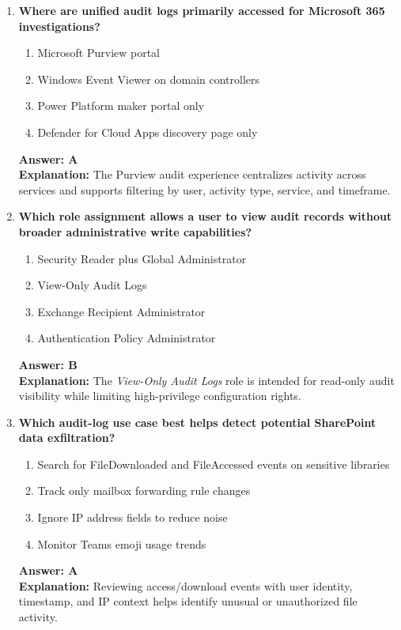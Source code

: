 \documentclass[10pt]{article}
\begin{document}
\begin{enumerate}[leftmargin=*]
\item \textbf{Where are unified audit logs primarily accessed for Microsoft 365 investigations?}
\begin{enumerate}[label=\Alph*.]
  \item Microsoft Purview portal
  \item Windows Event Viewer on domain controllers
  \item Power Platform maker portal only
  \item Defender for Cloud Apps discovery page only
\end{enumerate}
\textbf{Answer: A}\\
\textbf{Explanation:} The Purview audit experience centralizes activity across services and supports filtering by user, activity type, service, and timeframe.

\item \textbf{Which role assignment allows a user to view audit records without broader administrative write capabilities?}
\begin{enumerate}[label=\Alph*.]
  \item Security Reader plus Global Administrator
  \item View-Only Audit Logs
  \item Exchange Recipient Administrator
  \item Authentication Policy Administrator
\end{enumerate}
\textbf{Answer: B}\\
\textbf{Explanation:} The \textit{View-Only Audit Logs} role is intended for read-only audit visibility while limiting high-privilege configuration rights.

\item \textbf{Which audit-log use case best helps detect potential SharePoint data exfiltration?}
\begin{enumerate}[label=\Alph*.]
  \item Search for FileDownloaded and FileAccessed events on sensitive libraries
  \item Track only mailbox forwarding rule changes
  \item Ignore IP address fields to reduce noise
  \item Monitor Teams emoji usage trends
\end{enumerate}
\textbf{Answer: A}\\
\textbf{Explanation:} Reviewing access/download events with user identity, timestamp, and IP context helps identify unusual or unauthorized file activity.


\end{enumerate}
\end{document}
